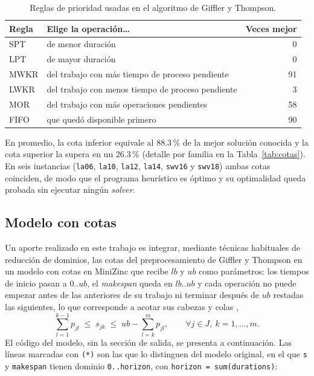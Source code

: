 \begin{table}[H]
  \centering
  \small
  \singlespacing
  \caption{Reglas de prioridad usadas en el algoritmo de Giffler y Thompson.}
  \label{tab:reglas}
  \begin{tabularx}{\textwidth}{l >{\raggedright\arraybackslash}X r}
    \toprule
    \textbf{Regla} & \textbf{Elige la operación\dots} & \textbf{Veces mejor} \\
    \midrule
    SPT  & de menor duración & 0 \\
    LPT  & de mayor duración & 0 \\
    MWKR & del trabajo con más tiempo de proceso pendiente & 91 \\
    LWKR & del trabajo con menos tiempo de proceso pendiente & 3 \\
    MOR  & del trabajo con más operaciones pendientes & 58 \\
    FIFO & que quedó disponible primero & 90 \\
    \bottomrule
  \end{tabularx}
  \par\vspace{2pt}{\footnotesize Veces mejor: número de instancias en que la regla
  dio la menor $ub$ (en caso de empate se cuenta la primera regla de la lista).}
\end{table}

En promedio, la cota inferior equivale al 88.3\,\% de la mejor solución
conocida y la cota superior la supera en un 26.3\,\% (detalle por familia en
la Tabla~\ref{tab:cotas}). En seis instancias (\texttt{la06}, \texttt{la10},
\texttt{la12}, \texttt{la14}, \texttt{swv16} y \texttt{swv18}) ambas cotas
coinciden, de modo que el programa heurístico es óptimo y su optimalidad queda
probada sin ejecutar ningún \textit{solver}.

\subsection{Modelo con cotas}
\label{sec:modelo_cotas}

Un aporte realizado en este trabajo es integrar, mediante técnicas habituales
de reducción de dominios, las cotas del preprocesamiento de Giffler y Thompson
en un modelo con cotas en MiniZinc que recibe $lb$ y $ub$ como parámetros: los tiempos de inicio pasan a $0..ub$, el
\textit{makespan} queda en $lb..ub$ y cada operación no puede empezar antes de
las anteriores de su trabajo ni terminar después de $ub$ restadas las
siguientes, lo que corresponde a acotar sus cabezas y colas \citep{carlier1994},
\begin{equation}
  \sum_{l=1}^{k-1} p_{jl} \;\le\; s_{jk} \;\le\; ub - \sum_{l=k}^{m} p_{jl},
  \qquad \forall j \in J,\ k = 1, \dots, m.
  \label{eq:cabeza_cola}
\end{equation}
El código del modelo, sin la sección de salida, se presenta a continuación.
Las líneas marcadas con \texttt{(*)} son las que lo distinguen del modelo
original, en el que \texttt{s} y \texttt{makespan} tienen dominio
\texttt{0..horizon}, con \texttt{horizon = sum(durations)}:


